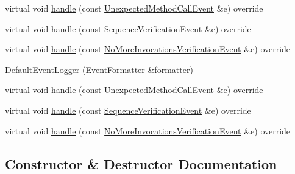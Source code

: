\begin{DoxyCompactItemize}
\item 
virtual void \mbox{\hyperlink{structfakeit_1_1DefaultEventLogger_a4bbb520dfe6bf042d7f0380e7b400bce}{handle}} (const \mbox{\hyperlink{structfakeit_1_1UnexpectedMethodCallEvent}{Unexpected\+Method\+Call\+Event}} \&e) override
\item 
virtual void \mbox{\hyperlink{structfakeit_1_1DefaultEventLogger_a730fe776b90249dd62d750a7d6171f90}{handle}} (const \mbox{\hyperlink{structfakeit_1_1SequenceVerificationEvent}{Sequence\+Verification\+Event}} \&e) override
\item 
virtual void \mbox{\hyperlink{structfakeit_1_1DefaultEventLogger_ac2df9faf9057e440c0aa314f54ce6f1c}{handle}} (const \mbox{\hyperlink{structfakeit_1_1NoMoreInvocationsVerificationEvent}{No\+More\+Invocations\+Verification\+Event}} \&e) override
\item 
\mbox{\hyperlink{structfakeit_1_1DefaultEventLogger_a20fe9266e4a323b5fc282d797fe7ecfd}{Default\+Event\+Logger}} (\mbox{\hyperlink{structfakeit_1_1EventFormatter}{Event\+Formatter}} \&formatter)
\item 
virtual void \mbox{\hyperlink{structfakeit_1_1DefaultEventLogger_a4bbb520dfe6bf042d7f0380e7b400bce}{handle}} (const \mbox{\hyperlink{structfakeit_1_1UnexpectedMethodCallEvent}{Unexpected\+Method\+Call\+Event}} \&e) override
\item 
virtual void \mbox{\hyperlink{structfakeit_1_1DefaultEventLogger_a730fe776b90249dd62d750a7d6171f90}{handle}} (const \mbox{\hyperlink{structfakeit_1_1SequenceVerificationEvent}{Sequence\+Verification\+Event}} \&e) override
\item 
virtual void \mbox{\hyperlink{structfakeit_1_1DefaultEventLogger_ac2df9faf9057e440c0aa314f54ce6f1c}{handle}} (const \mbox{\hyperlink{structfakeit_1_1NoMoreInvocationsVerificationEvent}{No\+More\+Invocations\+Verification\+Event}} \&e) override
\end{DoxyCompactItemize}


\subsection{Constructor \& Destructor Documentation}
\mbox{\label{structfakeit_1_1DefaultEventLogger_a20fe9266e4a323b5fc282d797fe7ecfd}} 
